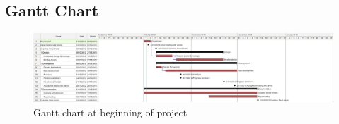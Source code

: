 \begin{appendices}


\newpage


\newpage

\begin{landscape}
\section{Gantt Chart}\label{sec:appendix_gantt}
\begin{figure}[th]
	\centering
	\includegraphics[height=0.45\textwidth, trim= 0 0 290pt 0, clip=true]{images/gantt-chart.jpg}
	\caption{Gantt chart at beginning of project}
\end{figure}
\end{landscape}
\newpage


\newpage


\newpage


\newpage


\newpage


\newpage


\end{appendices}
